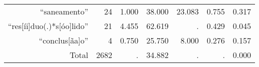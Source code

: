 \begin{table}[!htbp]
\begin{tabular}{rrrrrrr}
  ``saneamento''                                            & 24  & 1.000 & 38.000 & 23.083 & 0.755 & 0.317 \T \B \\
  ``res{[}íi{]}duo(.)*s{[}óo{]}lido''                       & 21  & 4.455 & 62.619 & .      & 0.429 & 0.045 \T \B \\
  ``conclus{[}ãa{]}o''                                      & 4   & 0.750 & 25.750 & 8.000  & 0.276 & 0.157 \T \B \\
  \hline
  Total                                                     & 2682& .     & 34.882 & .      & .     & 0.000 \T \B \\
   \hline

   \hline
  \end{tabular}
\end{table}